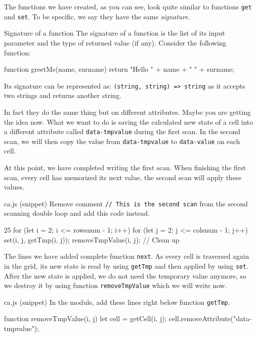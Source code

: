 The functions we have created, as you can see, look quite similar to functions
\texttt{get} and \texttt{set}. To be specific, we say they have the same
\textit{signature}.

\begin{tips}{Signature of a function}
The signature of a function is the list of its input parameter and the type of returned
value (if any). Consider the following function:
\begin{code}
function greetMe(name, surname) {
  return "Hello " + name + " " + surname;
}
\end{code}
Its signature can be represented as: \texttt{(string, string) => string} as it accepts
two strings and returns another string.
\end{tips}

In fact they do the same thing but on different attributes. Maybe you are getting the
idea now. What we want to do is saving the calculated new state of a cell into a
different attribute called \texttt{data-tmpvalue} during the first scan. In the second scan,
we will then copy the value from \texttt{data-tmpvalue} to \texttt{data-value} on
each cell.

At this point, we have completed writing the first scan. When finishing the first scan,
every cell has memorized its next value, the second scan will apply these values.

\begin{programcode}{ca.js (snippet)}
Remove comment \texttt{// This is the second scan} from the second scanning double loop and add this
code instead.
\begin{codeh1}{2}{5}
for (let i = 2; i <= rowsnum - 1; i++) {
  for (let j = 2; j <= colsnum - 1; j++) {
    set(i, j, getTmp(i, j));
    removeTmpValue(i, j); // Clean up
  }
}
\end{codeh1}
\end{programcode}

The lines we have added complete function \texttt{next}. As every cell is traversed again in the grid,
its new state is read by using \texttt{getTmp} and then applied by using \texttt{set}. After the new
state is applied, we do not need the temporary value anymore, so we destroy it by using function
\texttt{removeTmpValue} which we will write now.

\begin{programcode}{ca.js (snippet)}
In the module, add these lines right below function \texttt{getTmp}.
\begin{code}
function removeTmpValue(i, j) {
  let cell = getCell(i, j);
  cell.removeAttribute("data-tmpvalue");
}
\end{code}
\end{programcode}

